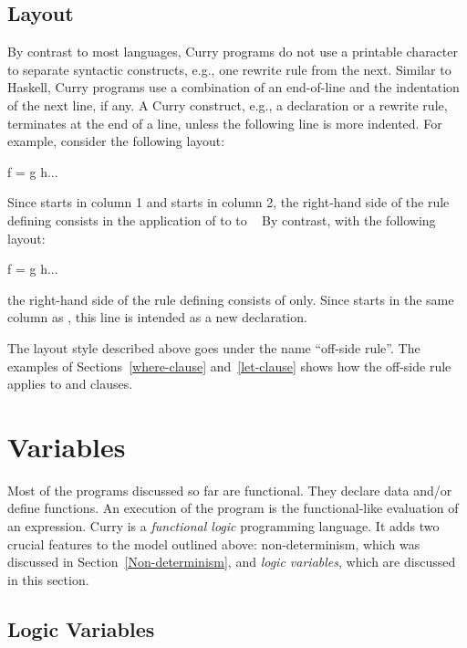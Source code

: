\subsection{Layout}
\label{sec-layout}

By contrast to most languages,
Curry programs do not use a printable character to separate
syntactic constructs, e.g., one rewrite rule from the next.
Similar to Haskell,
Curry programs use a combination of an end-of-line and
the indentation of the next line, if any.
A Curry construct, e.g., a  declaration or a rewrite rule,
terminates at the end of a line, unless the following line
is more indented.
For example, consider the following layout:
%
\begin{prog}
f = g
 h...
\end{prog}
%
Since  starts in column 1 and  starts in column 2,
the right-hand side of the rule defining  consists in
the application of  to  to \ %
By contrast, with the following layout:
%
\begin{prog}
f = g
h...
\end{prog}
%
the right-hand side of the rule defining  consists of
 only.
Since  starts in the same column as  ,
this line is intended as a new declaration.

The layout style described above goes under the name
``off-side rule''.
The examples of Sections~\ref{where-clause} and~\ref{let-clause}
shows how the off-side rule applies to  and
 clauses.

\section{Variables}

Most of the programs discussed so far are functional.
They declare data and/or define functions.
An execution of the program is the functional-like
evaluation of an expression.
Curry is a \emph{functional logic}
programming language.
It adds two crucial features to the model outlined above:
non-determinism, which was discussed in Section~\ref{Non-determinism},
and \emph{logic variables},
which are discussed in this section.

\subsection{Logic Variables}
\label{Logic variables}

